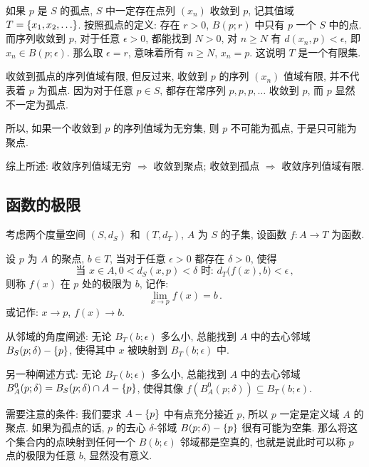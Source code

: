 \documentclass[UTF8]{ctexart}
\theoremstyle{mystyle}
\DeclarePairedDelimiter\set{\lbrace}{\rbrace}
\begin{document}
如果 $ p $ 是 $ S $ 的孤点, $ S $ 中一定存在点列 $ (x_n) $ 收敛到 $ p $, 记其值域 $ T = \set{x_1, x_2, \dots} $. 按照孤点的定义: 存在 $ r > 0 $, $ B(p; r) $ 中只有 $ p $ 一个 $ S $ 中的点. 而序列收敛到 $ p $, 对于任意 $ \epsilon > 0 $, 都能找到 $ N > 0 $, 对 $ n \geqslant N $ 有 $ d(x_n, p) < \epsilon $, 即 $ x_n \in B(p; \epsilon) $. 那么取 $ \epsilon = r $, 意味着所有 $ n \geqslant N $, $ x_n = p $. 这说明 $ T $ 是一个有限集. 

收敛到孤点的序列值域有限, 但反过来, 收敛到 $ p $ 的序列 $ (x_n) $ 值域有限, 并不代表着 $ p $ 为孤点. 因为对于任意 $ p \in S $, 都存在常序列 $ p, p, p, \dots $ 收敛到 $ p $, 而 $ p $ 显然不一定为孤点.

所以, 如果一个收敛到 $ p $ 的序列值域为无穷集, 则 $ p $ 不可能为孤点, 于是只可能为聚点.

综上所述: 收敛序列值域无穷 $ \Longrightarrow $ 收敛到聚点; 收敛到孤点 $ \Longrightarrow $ 收敛序列值域有限.

\subsection{函数的极限}
考虑两个度量空间 $ (S, d_S) $ 和 $ (T, d_T) $, $ A $ 为 $ S $ 的子集, 设函数 $ f \colon A \to T $ 为函数.

\begin{definition}
    设 $ p $ 为 $ A $ 的聚点, $ b \in T $, 当对于任意 $ \epsilon > 0 $ 都存在 $ \delta > 0 $, 使得
    \[ 
        \text{当 } x \in A , 0 < d_S(x, p) < \delta \text{ 时: }
        d_T \big( f(x), b \big) < \epsilon \,,
    \] 
    则称 $ f(x) $ 在 $ p $ 处的极限为 $ b $, 记作:
    \[ 
        \lim_{x \to p} f(x) = b \,.
    \]
    或记作: $ x \to p $, $ f(x) \to b $.
\end{definition}

从邻域的角度阐述: 无论 $ B_T(b; \epsilon) $ 多么小, 总能找到 $ A $ 中的去心邻域 $ B_S(p; \delta) - \set{p} $, 使得其中 $ x $ 被映射到 $ B_T(b; \epsilon) $ 中.

另一种阐述方式: 无论 $ B_T(b; \epsilon) $ 多么小, 总能找到 $ A $ 中的去心邻域 $ B_A^0(p; \delta) = B_S(p; \delta) \cap A - \set{p} $, 使得其像 $ f(B_A^0(p; \delta)) \subseteq B_T(b; \epsilon) $.

需要注意的条件: 我们要求 $ A - \set{p} $ 中有点充分接近 $ p $, 所以 $ p $ 一定是定义域 $ A $ 的聚点. 如果为孤点的话, $ p $ 的去心 $ \delta $-邻域 $ B(p; \delta) - \set{p} $ 很有可能为空集. 那么将这个集合内的点映射到任何一个 $ B(b; \epsilon) $ 邻域都是空真的, 也就是说此时可以称 $ p $ 点的极限为任意 $ b $, 显然没有意义.
\end{document}
